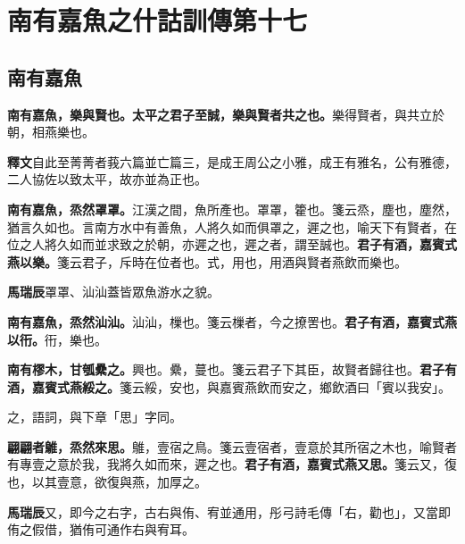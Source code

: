 \chapter{南有嘉魚之什詁訓傳第十七}

\section{南有嘉魚}


\textbf{南有嘉魚，樂與賢也。太平之君子至誠，樂與賢者共之也。}{\footnotesize 樂得賢者，與共立於朝，相燕樂也。}

\begin{quoting}\textbf{釋文}自此至菁菁者莪六篇並亡篇三，是成王周公之小雅，成王有雅名，公有雅德，二人協佐以致太平，故亦並為正也。\end{quoting}

\textbf{南有嘉魚，烝然罩罩。}{\footnotesize 江漢之間，魚所產也。罩罩，籗也。箋云烝，塵也，塵然，猶言久如也。言南方水中有善魚，人將久如而俱罩之，遲之也，喻天下有賢者，在位之人將久如而並求致之於朝，亦遲之也，遲之者，謂至誠也。}\textbf{君子有酒，嘉賓式燕以樂。}{\footnotesize 箋云君子，斥時在位者也。式，用也，用酒與賢者燕飲而樂也。}

\begin{quoting}\textbf{馬瑞辰}罩罩、汕汕蓋皆眾魚游水之貌。\end{quoting}

\textbf{南有嘉魚，烝然汕汕。}{\footnotesize 汕汕，樔也。箋云樔者，今之撩罟也。}\textbf{君子有酒，嘉賓式燕以衎。}{\footnotesize 衎，樂也。}

\textbf{南有樛木，甘瓠纍之。}{\footnotesize 興也。纍，蔓也。箋云君子下其臣，故賢者歸往也。}\textbf{君子有酒，嘉賓式燕綏之。}{\footnotesize 箋云綏，安也，與嘉賓燕飲而安之，鄉飲酒曰「賓以我安」。}

\begin{quoting}之，語詞，與下章「思」字同。\end{quoting}

\textbf{翩翩者鵻，烝然來思。}{\footnotesize 鵻，壹宿之鳥。箋云壹宿者，壹意於其所宿之木也，喻賢者有專壹之意於我，我將久如而來，遲之也。}\textbf{君子有酒，嘉賓式燕又思。}{\footnotesize 箋云又，復也，以其壹意，欲復與燕，加厚之。}

\begin{quoting}\textbf{馬瑞辰}又，即今之右字，古右與侑、宥並通用，彤弓詩毛傳「右，勸也」，又當即侑之假借，猶侑可通作右與宥耳。\end{quoting}

